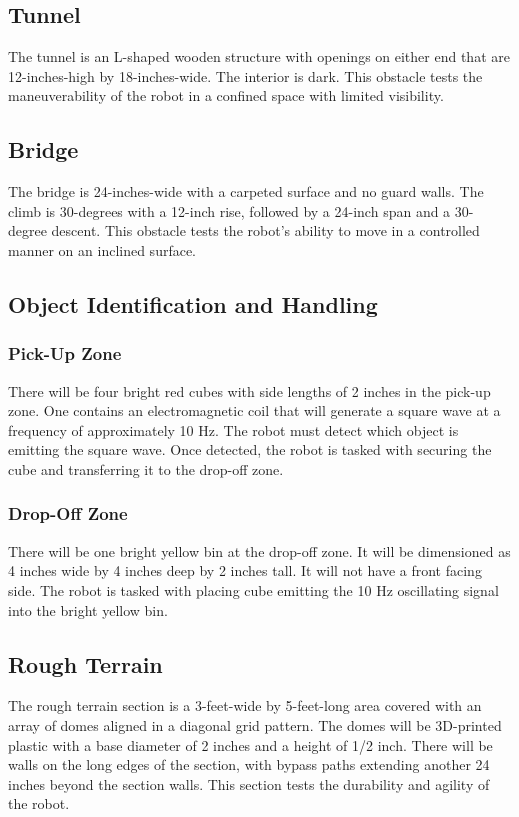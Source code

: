 \subsection{Tunnel}
The tunnel is an L-shaped wooden structure with openings on either end that are 12-inches-high by 18-inches-wide. The interior is dark. This obstacle tests the maneuverability of the robot in a confined space with limited visibility.

\subsection{Bridge}
The bridge is 24-inches-wide with a carpeted surface and no guard walls. The climb is 30-degrees with a 12-inch rise, followed by a 24-inch span and a 30-degree descent. This obstacle tests the robot’s ability to move in a controlled manner on an inclined surface.

\subsection{Object Identification and Handling}
	\subsubsection{Pick-Up Zone}
		There will be four bright red cubes with side lengths of 2 inches in the pick-up zone. One contains an electromagnetic coil that will generate a square wave at a frequency of approximately 10 Hz. The robot must detect which object is emitting the square wave. Once detected, the robot is tasked with securing the cube and transferring it to the drop-off zone.
	\subsubsection{Drop-Off Zone}
		There will be one bright yellow bin at the drop-off zone. It will be dimensioned as 4 inches wide by 4 inches deep by 2 inches tall. It will not have a front facing side. The robot is tasked with placing  cube emitting the 10 Hz oscillating signal into the bright yellow bin.

\subsection{Rough Terrain}
The rough terrain section is a 3-feet-wide by 5-feet-long area covered with an array of domes aligned in a diagonal grid pattern. The domes will be 3D-printed plastic with a base diameter of 2 inches and a height of 1/2 inch. There will be walls on the long edges of the section, with bypass paths extending another 24 inches beyond the section walls. This section tests the durability and agility of the robot.


